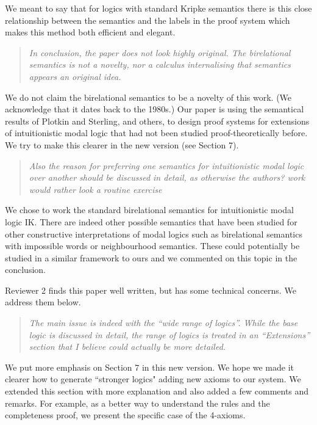 \documentclass[10pt]{article}
\begin{document}
We meant to say that for logics with standard Kripke semantics 
there is this close relationship between the semantics and the labels in 
the proof system which makes this method both efficient and elegant.

\begin{quote}\it
In conclusion, the paper does not look highly original. The 
birelational semantics is not a novelty, nor a calculus 
internalising that semantics appears an original idea.
\end{quote}

We do not claim the birelational semantics to be a novelty of this work.
(We acknowledge that it dates back to the 1980s.) Our paper is using the 
semantical results of Plotkin and Sterling, and others, to design proof 
systems for extensions of intuitionistic modal logic that had not been 
studied proof-theoretically before. We try to make this clearer in the new 
version (see Section 7).

\begin{quote}\it
Also the reason for preferring one semantics for intuitionistic 
modal logic over another should be discussed in detail, as 
otherwise the authors? work would rather look a routine exercise
\end{quote}

We chose to work the standard birelational semantics for intuitionistic modal 
logic IK. There are indeed other possible semantics that have been studied 
for other constructive interpretations of modal logics such as birelational 
semantics with impossible words or neighbourhood semantics. These could 
potentially be studied in a similar framework to ours and we commented on 
this topic in the conclusion.

\medskip
Reviewer 2 finds this paper well written, but has some 
technical concerns. We address them below.

\begin{quote}\it
The main issue is indeed with the ``wide range of logics''. While the
base logic is discussed in detail, the range of logics is treated
in an ``Extensions'' section that I believe could actually be more
detailed.
\end{quote}

We put more emphasis on Section 7 in this new version. We hope we made 
it clearer how to generate ``stronger logics" adding new axioms to our system. 
We extended this section with more explanation and also added a few comments 
and remarks. For example, as a better way to understand the rules and the 
completeness proof, we present the specific case of the 4-axioms.
\end{document}

